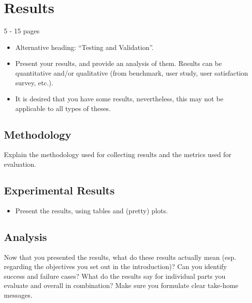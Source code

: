 
\chapter{Results}
\label{ch:eval}
5 - 15 pages
\begin{itemize}
\item Alternative heading: ``Testing and Validation''.
\item Present your results, and provide an analysis of them. Results can be quantitative and/or qualitative (from benchmark, user study, user satisfaction survey, etc.).
\item It is desired that you have some results, nevertheless, this may not be applicable to all types of theses.
\end{itemize}

\section{Methodology}
Explain the methodology used for collecting results and the metrics used for evaluation.

\section{Experimental Results}
\begin{itemize}
    \item Present the results, using tables and (pretty) plots.
\end{itemize}

\section{Analysis}
Now that you presented the results, what do these results actually mean (esp. regarding the objectives you set out in the introduction)? Can you identify success and failure cases? What do the results say for individual parts you evaluate and overall in combination? Make sure you formulate clear take-home messages.

